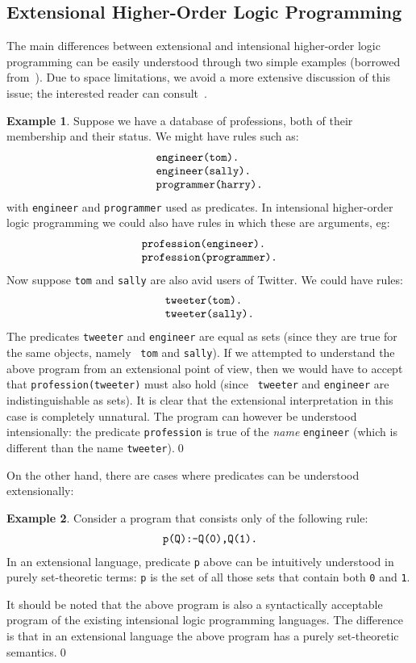 \documentclass[submission,copyright]{eptcs}
\theoremstyle{definition}
\newtheorem{example}{Example}
\begin{document}
\subsection{Extensional Higher-Order Logic Programming}
The main differences between extensional and intensional higher-order logic programming 
can be easily understood through two simple examples (borrowed from~\cite{CharalambidisHRW13}).
Due to space limitations, we avoid a more extensive discussion of this issue; the interested
reader can consult~\cite{CharalambidisHRW13}.
\begin{example}\label{intensional-predicate}
Suppose we have a database of professions, both of their membership
and their status. We might have rules such as:
\[
\begin{array}{l}
\mbox{\tt engineer(tom).}\\
\mbox{\tt engineer(sally).}\\
\mbox{\tt programmer(harry).}
\end{array}
\]
with {\tt engineer} and {\tt programmer} used as predicates. In
intensional higher-order logic programming we could also have rules
in which these are arguments, eg:
\[
\begin{array}{l}
\mbox{\tt profession(engineer).}\\
\mbox{\tt profession(programmer).}
\end{array}
\]
Now suppose {\tt tom} and {\tt sally} are also avid users of
Twitter. We could have rules:
\[
\begin{array}{l}
\mbox{\tt tweeter(tom).}\\
\mbox{\tt tweeter(sally).}
\end{array}
\]
The predicates {\tt tweeter} and {\tt engineer} are
equal as sets (since they are true for the same objects, namely {\tt
tom} and {\tt sally}). If we attempted to understand the above
program from an extensional point of view, then we would have to
accept that {\tt profession(tweeter)} must also hold (since {\tt
tweeter} and {\tt engineer} are indistinguishable as sets). It is
clear that the extensional interpretation in this case is completely
unnatural. The program can however be understood intensionally: the
predicate {\tt profession} is true of the {\em name} {\tt engineer}
(which is different than the name {\tt tweeter}).\qed
\end{example}
On the other hand, there are cases where predicates can be
understood extensionally:
\begin{example}\label{extensional-predicate}
Consider a program that consists only of the following rule:
\[
\begin{array}{l}
\mbox{\tt p(Q):-Q(0),Q(1).}
\end{array}
\]
In an extensional language, predicate {\tt p} above can be
intuitively understood in purely set-theoretic terms: {\tt p} is the
set of all those sets that contain both {\tt 0} and {\tt 1}.

It should be noted that the above program is also a syntactically
acceptable program of the existing intensional logic programming
languages. The difference is that in an extensional language the
above program has a purely set-theoretic semantics.\qed
\end{example}
\end{document}

